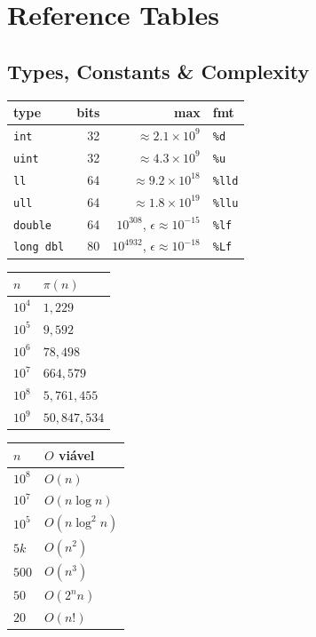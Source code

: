 \newpage
\setlength{\parindent}{0pt}

\section{Reference Tables}

\subsection{Types, Constants \& Complexity}

\fontsize{6.5}{8}\selectfont
\setlength{\tabcolsep}{3pt}

\noindent\begin{minipage}[c]{0.52\linewidth}
\begin{tabular}{lrrl}
\toprule
type & bits & max & fmt \\
\midrule
\texttt{int}       & 32 & $\approx 2.1\!\times\!10^9$    & \texttt{\%d}   \\
\texttt{uint}      & 32 & $\approx 4.3\!\times\!10^9$    & \texttt{\%u}   \\
\texttt{ll}        & 64 & $\approx 9.2\!\times\!10^{18}$ & \texttt{\%lld} \\
\texttt{ull}       & 64 & $\approx 1.8\!\times\!10^{19}$ & \texttt{\%llu} \\
\texttt{double}    & 64 & $10^{308}$, $\epsilon\!\approx\!10^{-15}$ & \texttt{\%lf} \\
\texttt{long dbl}  & 80 & $10^{4932}$, $\epsilon\!\approx\!10^{-18}$ & \texttt{\%Lf} \\
\bottomrule
\end{tabular}

\vspace{4pt}

\begin{tabular}{ll}
\toprule
$n$ & $\pi(n)$ \\
\midrule
$10^4$ & $1{,}229$       \\
$10^5$ & $9{,}592$       \\
$10^6$ & $78{,}498$      \\
$10^7$ & $664{,}579$     \\
$10^8$ & $5{,}761{,}455$ \\
$10^9$ & $50{,}847{,}534$ \\
\bottomrule
\end{tabular}
\hspace{4pt}
\begin{tabular}{ll}
\toprule
$n$ & $O$ viável \\
\midrule
$10^8$ & $O(n)$ \\
$10^7$ & $O(n\log n)$ \\
$10^5$ & $O(n\log^2\!n)$ \\
$5k$   & $O(n^2)$ \\
$500$  & $O(n^3)$ \\
$50$   & $O(2^n n)$ \\
$20$   & $O(n!)$ \\
\bottomrule
\end{tabular}
\end{minipage}%
